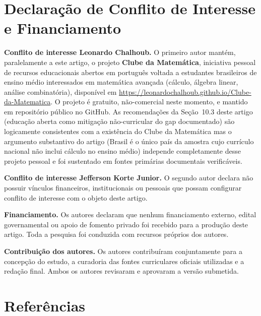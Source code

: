 \documentclass[12pt,a4paper,oneside]{article}
\begin{document}
\section*{Declaração de Conflito de Interesse e Financiamento}

\noindent\textbf{Conflito de interesse \textemdash{} Leonardo Chalhoub.}
O primeiro autor mantém, paralelamente a este artigo, o projeto
\textbf{Clube da Matemática}, iniciativa pessoal de recursos
educacionais abertos em português voltada a estudantes brasileiros
de ensino médio interessados em matemática avançada (cálculo,
álgebra linear, análise combinatória), disponível em
\url{https://leonardochalhoub.github.io/Clube-da-Matematica}. O
projeto é gratuito, não-comercial neste momento, e mantido em
repositório público no GitHub. As recomendações da Seção~10.3 deste
artigo (educação aberta como mitigação não-curricular do gap
documentado) são logicamente consistentes com a existência do Clube
da Matemática \textemdash{} mas o argumento substantivo do artigo
(Brasil é o único país da amostra cujo currículo nacional não
inclui cálculo no ensino médio) independe completamente desse
projeto pessoal e foi sustentado em fontes primárias documentais
verificáveis.

\medskip

\noindent\textbf{Conflito de interesse \textemdash{} Jefferson Korte
Junior.} O segundo autor declara não possuir vínculos financeiros,
institucionais ou pessoais que possam configurar conflito de
interesse com o objeto deste artigo.

\medskip

\noindent\textbf{Financiamento.} Os autores declaram que nenhum
financiamento externo, edital governamental ou apoio de fomento
privado foi recebido para a produção deste artigo. Toda a pesquisa
foi conduzida com recursos próprios dos autores.

\medskip

\noindent\textbf{Contribuição dos autores.} Os autores contribuíram
conjuntamente para a concepção do estudo, a curadoria das fontes
curriculares oficiais utilizadas e a redação final. Ambos os autores
revisaram e aprovaram a versão submetida.

\newpage
\section*{Referências}
\end{document}
